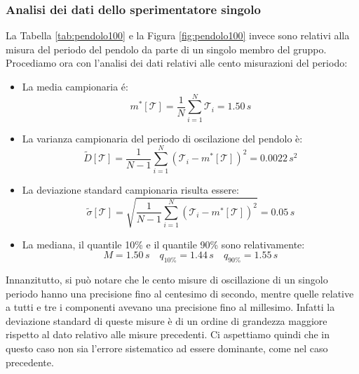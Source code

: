 \subsubsection{Analisi dei dati dello sperimentatore singolo}

La Tabella \ref{tab:pendolo100} e la Figura \ref{fig:pendolo100} invece sono relativi alla misura del periodo del pendolo da parte di un singolo membro del gruppo.
Procediamo ora con l'analisi dei dati relativi alle cento misurazioni del periodo:

\begin{itemize}
    \item{La media campionaria é:}
        \begin{equation*}
            m^*[\mathcal{T}] = \frac{1}{N} \sum_{i=1}^{N} \mathcal{T}_i = 1.50\,s
        \end{equation*} 

    \item{La varianza campionaria del periodo di oscilazione del pendolo è:}
        \begin{equation*}
            \tilde{D}[\mathcal{T}] = \frac{1}{N - 1} \sum_{i=1}^{N} (\mathcal{T}_i - m^*[\mathcal{T}])^2 = 0.0022\,s^2
        \end{equation*}

    \item{La deviazione standard campionaria risulta essere:}
        \begin{equation*}
            \tilde{\sigma}[\mathcal{T}] = \sqrt{\frac{1}{N - 1} \sum_{i=1}^{N} (\mathcal{T}_i - m^*[\mathcal{T}])^2} = 0.05\,s
        \end{equation*}

    \item{La mediana, il quantile 10\% e il quantile 90\% sono relativamente:}
        \begin{equation*}
            M = 1.50\,s \quad
            q_{10\%} = 1.44\,s \quad
            q_{90\%} = 1.55\,s
        \end{equation*}
\end{itemize}

Innanzitutto, si può notare che le cento misure di oscillazione di un singolo
periodo hanno una precisione fino al centesimo di secondo, mentre quelle relative
a tutti e tre i componenti avevano una precisione fino al millesimo. Infatti la
deviazione standard di queste misure è di un ordine di grandezza maggiore rispetto
al dato relativo alle misure precedenti. Ci aspettiamo quindi che in questo caso 
non sia l'errore sistematico ad essere dominante, come nel caso precedente.

